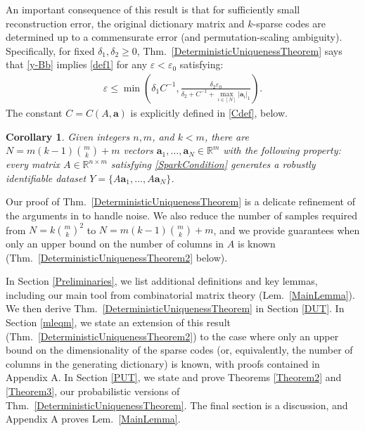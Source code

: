 \documentclass[journal, twocolumn]{IEEEtran}
\newtheorem{corollary}{Corollary}
\begin{document}

An important consequence of this result is that for sufficiently small reconstruction error, the original dictionary matrix and $k$-sparse codes are determined up to a commensurate error (and permutation-scaling ambiguity). Specifically, for fixed $\delta_1, \delta_2 \geq 0$, Thm.~\ref{DeterministicUniquenessTheorem} says that \eqref{y-Bb} implies \eqref{def1} for any $\varepsilon < \varepsilon_0$ satisfying:
\begin{align}\label{epsd1d2}
\varepsilon \leq \min \left( \delta_1 C^{-1}, \frac{ \delta_2 \varepsilon_0}{\delta_2 + C^{-1} + \max_{i \in [N]} |\mathbf{a}_i|_1} \right).
\end{align}
The constant $C = C(A, \mathbf{a})$ is explicitly defined in \eqref{Cdef}, below. 

\begin{corollary}\label{DeterministicUniquenessCorollary}
Given integers $n, m$, and $k < m$, there are $N =  m(k-1){m \choose k}+m$ vectors $\mathbf{a}_1, \ldots, \mathbf{a}_N \in \mathbb{R}^m$ with the following property: every matrix $A \in \mathbb{R}^{n \times m}$ satisfying \eqref{SparkCondition} generates a robustly identifiable dataset $Y = \{A\mathbf{a}_1, \ldots, A\mathbf{a}_N\}$.
\end{corollary}

Our proof of Thm.~\ref{DeterministicUniquenessTheorem} is a delicate refinement of the arguments in \cite{Hillar15} to handle noise.  We also reduce the number of samples required from $N=k{m \choose k}^2$ to $N = m(k-1){m \choose k}+m$, and we provide guarantees when only an upper bound on the number of columns in $A$ is known (Thm.~\ref{DeterministicUniquenessTheorem2} below). 

In Section \ref{Preliminaries}, we list additional definitions and key lemmas, including our main tool from combinatorial matrix theory (Lem.~\ref{MainLemma}). We then derive Thm.~\ref{DeterministicUniquenessTheorem} in Section \ref{DUT}. In Section \ref{mleqm}, we state an extension of this result (Thm.~\ref{DeterministicUniquenessTheorem2}) to the case where only an upper bound on the dimensionality of the sparse codes (or, equivalently, the number of columns in the generating dictionary) is known, with proofs contained in Appendix A. In Section \ref{PUT}, we state and prove Theorems \ref{Theorem2} and \ref{Theorem3}, our probabilistic versions of Thm.~\ref{DeterministicUniquenessTheorem}. The final section is a discussion, and Appendix A proves Lem.~\ref{MainLemma}.
\end{document}
